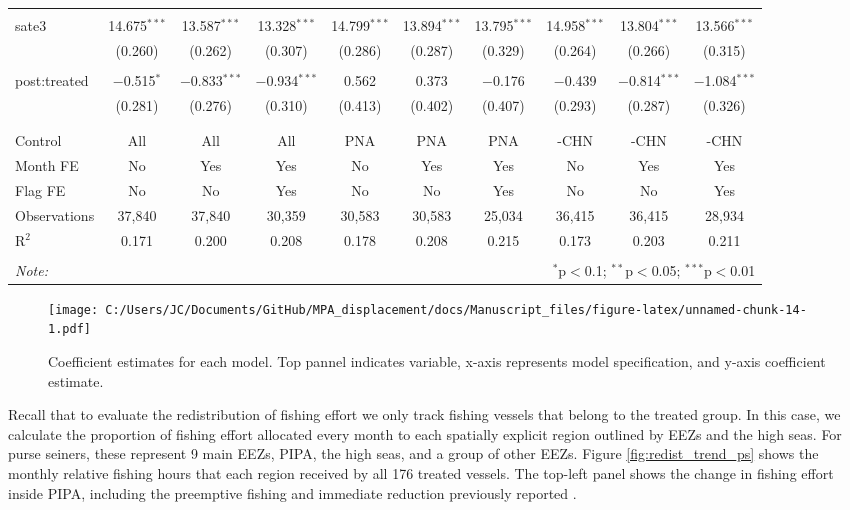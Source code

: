 \documentclass[11pt,]{article}
\begin{document}
\begin{landscape}
\begin{table}[!htbp]
\begin{tabular}{@{\extracolsep{1pt}}lccccccccc}
  & & & & & & & & & \\ 
 sate3 & 14.675$^{***}$ & 13.587$^{***}$ & 13.328$^{***}$ & 14.799$^{***}$ & 13.894$^{***}$ & 13.795$^{***}$ & 14.958$^{***}$ & 13.804$^{***}$ & 13.566$^{***}$ \\ 
  & (0.260) & (0.262) & (0.307) & (0.286) & (0.287) & (0.329) & (0.264) & (0.266) & (0.315) \\ 
  & & & & & & & & & \\ 
 post:treated & $-$0.515$^{*}$ & $-$0.833$^{***}$ & $-$0.934$^{***}$ & 0.562 & 0.373 & $-$0.176 & $-$0.439 & $-$0.814$^{***}$ & $-$1.084$^{***}$ \\ 
  & (0.281) & (0.276) & (0.310) & (0.413) & (0.402) & (0.407) & (0.293) & (0.287) & (0.326) \\ 
  & & & & & & & & & \\ 
\hline \\[-1.8ex] 
Control & All & All & All & PNA & PNA & PNA & -CHN & -CHN & -CHN \\ 
Month FE & No & Yes & Yes & No & Yes & Yes & No & Yes & Yes \\ 
Flag FE & No & No & Yes & No & No & Yes & No & No & Yes \\ 
Observations & 37,840 & 37,840 & 30,359 & 30,583 & 30,583 & 25,034 & 36,415 & 36,415 & 28,934 \\ 
R$^{2}$ & 0.171 & 0.200 & 0.208 & 0.178 & 0.208 & 0.215 & 0.173 & 0.203 & 0.211 \\ 
\hline 
\hline \\[-1.8ex] 
\textit{Note:}  & \multicolumn{9}{r}{$^{*}$p$<$0.1; $^{**}$p$<$0.05; $^{***}$p$<$0.01} \\ 
\end{tabular} 
\end{table} 

\end{landscape}
\clearpage

\begin{figure}
\centering
\texttt{[image: C:/Users/JC/Documents/GitHub/MPA\_displacement/docs/Manuscript\_files/figure-latex/unnamed-chunk-14-1.pdf]}
\caption{\label{fig:unnamed-chunk-14}\label{fig:long}Coefficient estimates
for each model. Top pannel indicates variable, x-axis represents model
specification, and y-axis coefficient estimate.}
\end{figure}

Recall that to evaluate the redistribution of fishing effort we only
track fishing vessels that belong to the treated group. In this case, we
calculate the proportion of fishing effort allocated every month to each
spatially explicit region outlined by EEZs and the high seas. For purse
seiners, these represent 9 main EEZs, PIPA, the high seas, and a group
of other EEZs. Figure \ref{fig:redist_trend_ps} shows the monthly
relative fishing hours that each region received by all 176 treated
vessels. The top-left panel shows the change in fishing effort inside
PIPA, including the preemptive fishing and immediate reduction
previously reported \citep{mcdermott_2018}.
\end{document}
